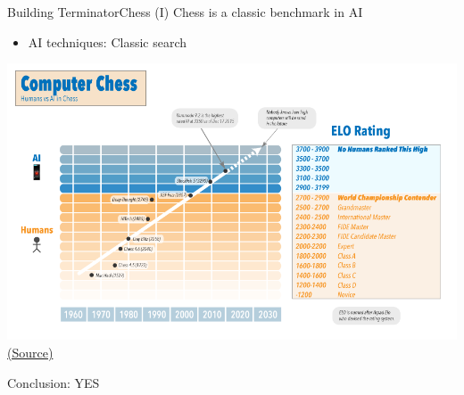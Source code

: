 \documentclass[10pt,compress]{beamer} %
\begin{document}
\begin{frame}{Building Terminator}{Chess (I)}
	Chess is a classic benchmark in AI
	\begin{itemize}
		\item AI techniques: Classic search
	\end{itemize}

	\vspace{-0.4cm}

	\begin{center}
		\includegraphics[width=0.7\linewidth]{figs/elo.png}\\
		\tiny{\href{http://www.statisticsviews.com/details/feature/8791241/Artificial-Intelligence-Solving-the-Chinese-Room-Argument.html}{(Source)}}
	\end{center}

	\vspace{-0.6cm}

	Conclusion: YES
\end{frame}
\end{document}
